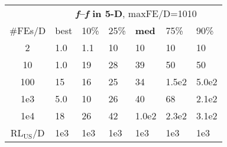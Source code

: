 \begin{tabular}{c|llllll}
 & \multicolumn{6}{|c}{\textbf{\textit{f}\raisebox{-0.35ex}{1}--\textit{f}\raisebox{-0.35ex}{24} in 5-D}, maxFE/D=1010}\\
\#FEs/D & best & 10\% & 25\% & \textbf{med} & 75\% & 90\%\\
2 & \hspace*{1ex}1.0 & \hspace*{1ex}1.1 & 10 & 10 & 10 & 10\\
10 & \hspace*{1ex}1.0 & 19 & 28 & 39 & 50 & 50\\
100 & 15 & 16 & 25 & 34 & 1.5e2 & 5.0e2\\
1e3 & \hspace*{1ex}5.0 & 10 & 26 & 40 & 68 & 2.1e2\\
1e4 & 18 & 26 & 42 & 1.0e2 & 2.3e2 & 3.1e2\\
$\text{RL}_{\text{US}}$/D & 1e3 & 1e3 & 1e3 & 1e3 & 1e3 & 1e3
\end{tabular}
